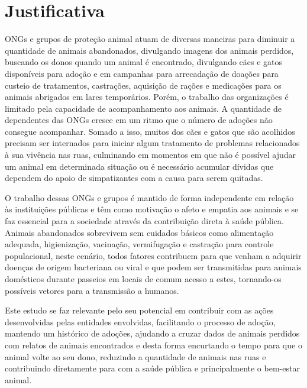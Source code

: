 \section{Justificativa}
\label{sec:Justificativa}
ONGs e grupos de proteção animal atuam de diversas maneiras para diminuir a quantidade de animais abandonados, divulgando imagens dos animais perdidos, buscando os donos quando um animal é encontrado, divulgando cães e gatos disponíveis para adoção e em campanhas para arrecadação de doações para custeio de tratamentos, castrações, aquisição de rações e medicações para os animais abrigados em lares temporários. Porém, o trabalho das organizações é limitado pela capacidade de acompanhamento aos animais. A quantidade de dependentes das ONGs cresce em um ritmo que o número de adoções não consegue acompanhar. Somado a isso, muitos dos cães e gatos que são acolhidos precisam ser internados para iniciar algum tratamento de problemas relacionados à sua vivência nas ruas, culminando em momentos em que não é possível ajudar um animal em determinada situação ou é necessário acumular dívidas que dependem do apoio de simpatizantes com a causa para serem quitadas.

O trabalho dessas ONGs e grupos é mantido de forma independente em relação às instituições públicas e têm como motivação o afeto e empatia aos animais e se faz essencial para a sociedade através da contribuição direta à saúde pública. Animais abandonados sobrevivem sem cuidados básicos como alimentação adequada, higienização, vacinação, vermifugação e castração para controle populacional, neste cenário, todos fatores contribuem para que venham a adquirir doenças de origem bacteriana ou viral e que podem ser transmitidas para animais domésticos durante passeios em locais de comum acesso a estes, tornando-os possíveis vetores para a transmissão a humanos. 



Este estudo se faz relevante pelo seu potencial em contribuir com as ações desenvolvidas pelas entidades envolvidas, facilitando o processo de adoção, mantendo um histórico de adoções, ajudando a cruzar dados de animais perdidos com relatos de animais encontrados e desta forma encurtando o tempo para que o animal volte ao seu dono, reduzindo a quantidade de animais nas ruas e contribuindo diretamente para com a saúde pública e principalmente o bem-estar animal.

